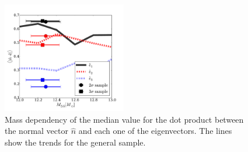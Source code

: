 \documentclass{emulateapj}
\begin{document}



\begin{figure}
\begin{center}
  \includegraphics[width=0.48\textwidth]{median_mass_alignment.pdf}
\caption{Mass dependency of the median value for the dot product
  between the normal vector $\hat{n}$ and each one of the
  eigenvectors.  The lines show the trends for the general sample.
\label{fig:median_alignment_n}}
\end{center}
\end{figure}
\end{document}
